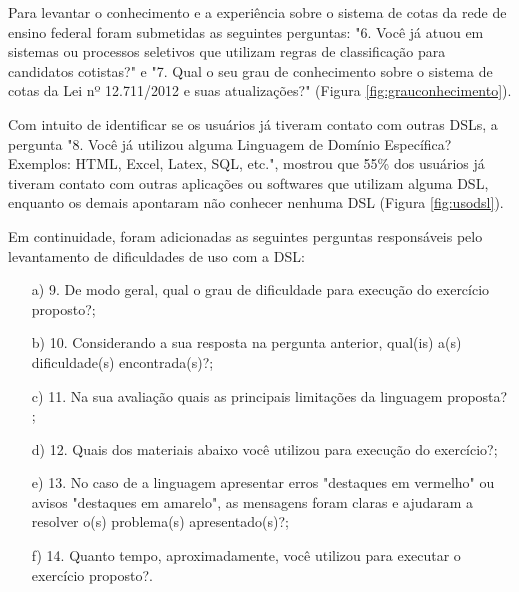 

\newpage
Para levantar o conhecimento e a experiência sobre o sistema de cotas da rede de ensino federal foram submetidas as seguintes perguntas: "6. Você já atuou em sistemas ou processos seletivos que utilizam regras de classificação para candidatos cotistas?" e "7. Qual o seu grau de conhecimento sobre o sistema de cotas da Lei nº 12.711/2012 e suas atualizações?" (Figura \ref{fig:grauconhecimento}).



Com intuito de identificar se os usuários já tiveram contato com outras DSLs, a pergunta "8. Você já utilizou alguma Linguagem de Domínio Específica? Exemplos: HTML, Excel, Latex, SQL, etc.", mostrou que 55\% dos usuários já tiveram contato com outras aplicações ou softwares que utilizam alguma \gls{DSL}, enquanto os demais apontaram não conhecer nenhuma DSL (Figura \ref{fig:usodsl}).



\newpage
Em continuidade, foram adicionadas as seguintes perguntas responsáveis pelo levantamento de dificuldades de uso com a DSL:

\begin{enumerate}

    \item[a)] 9. De modo geral, qual o grau de dificuldade para execução do exercício proposto?;
    
    \item[b)] 10. Considerando a sua resposta na pergunta anterior, qual(is) a(s) dificuldade(s) encontrada(s)?;
    
    \item[c)] 11. Na sua avaliação quais as principais limitações da linguagem proposta?  ;
    
   \item[d)]  12. Quais dos materiais abaixo você utilizou para execução do exercício?;
   
   \item[e)] 13. No caso de a linguagem apresentar erros "destaques em vermelho" ou avisos "destaques em amarelo", as mensagens foram claras e ajudaram a resolver o(s) problema(s) apresentado(s)?;
   
   \item[f)] 14. Quanto tempo, aproximadamente, você utilizou para executar o exercício proposto?.   

\end{enumerate}

